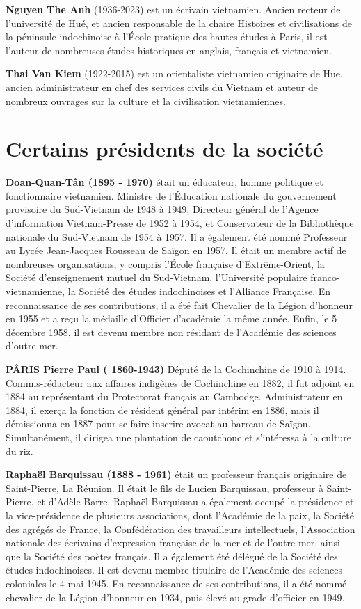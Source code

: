 \textbf{Nguyen The Anh} (1936-2023) est un écrivain vietnamien. Ancien recteur de l'université de Hué, et ancien responsable de la chaire Histoires et civilisations de la péninsule indochinoise à l'École pratique des hautes études à Paris, il est l'auteur de nombreuses études historiques en anglais, français et vietnamien.

\textbf{Thai Van Kiem} (1922-2015) est un orientaliste vietnamien originaire de Hue, ancien administrateur en chef des services civils du Vietnam et auteur de nombreux ouvrages sur la culture et la civilisation vietnamiennes.
\newpage 
\section{Certains présidents de la société}

\textbf{Doan-Quan-Tân (1895 - 1970)} était un éducateur, homme politique et fonctionnaire vietnamien. Ministre de l'Éducation nationale du gouvernement provisoire du Sud-Vietnam de 1948 à 1949, Directeur général de l'Agence d'information Vietnam-Presse de 1952 à 1954, et Conservateur de la Bibliothèque nationale du Sud-Vietnam de 1954 à 1957. Il a également été nommé Professeur au Lycée Jean-Jacques Rousseau de Saïgon en 1957.
Il était un membre actif de nombreuses organisations, y compris l'École française d'Extrême-Orient, la Société d'enseignement mutuel du Sud-Vietnam, l'Université populaire franco-vietnamienne, la Société des études indochinoises et l'Alliance Française. En reconnaissance de ses contributions, il a été fait Chevalier de la Légion d'honneur en 1955 et a reçu la médaille d'Officier d'académie la même année.
Enfin, le 5 décembre 1958, il est devenu membre non résidant de l'Académie des sciences d'outre-mer.

\textbf{PÂRIS Pierre Paul ( 1860-1943)}
Député de la Cochinchine de 1910 à 1914.
Commis-rédacteur aux affaires indigènes de Cochinchine en 1882, il fut adjoint en 1884 au représentant du Protectorat français au Cambodge. Administrateur en 1884, il exerça la fonction de résident général par intérim en 1886, mais il démissionna en 1887 pour se faire inscrire avocat au barreau de Saïgon.
Simultanément, il dirigea une plantation de caoutchouc et s'intéressa à la culture du riz.

\textbf{Raphaël Barquissau (1888 - 1961)} était un professeur français originaire de Saint-Pierre, La Réunion. Il était le fils de Lucien Barquissau, professeur à Saint-Pierre, et d'Adèle Barre.
Raphaël Barquissau a également occupé la présidence et la vice-présidence de plusieurs associations, dont l'Académie de la paix, la Société des agrégés de France, la Confédération des travailleurs intellectuels, l'Association nationale des écrivains d'expression française de la mer et de l'outre-mer, ainsi que la Société des poètes français. Il a également été délégué de la Société des études indochinoises.
Il est devenu membre titulaire de l'Académie des sciences coloniales le 4 mai 1945. En reconnaissance de ses contributions, il a été nommé chevalier de la Légion d'honneur en 1934, puis élevé au grade d'officier en 1949.

